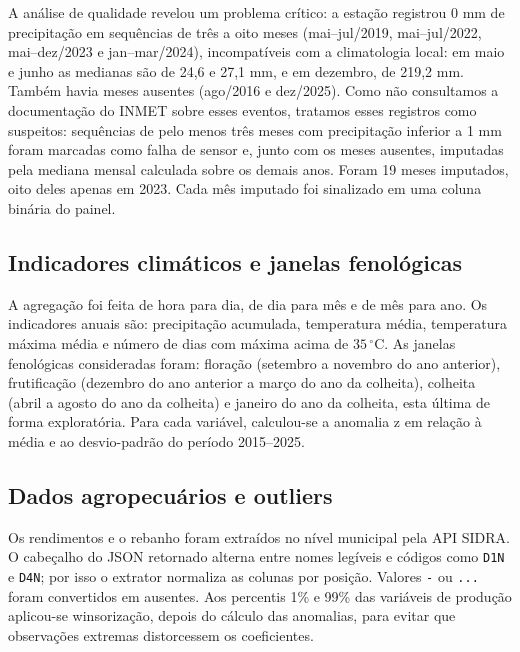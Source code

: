 \documentclass{RITA}
\begin{document}
A an\'alise de qualidade revelou um problema cr\'itico: a esta\c{c}\~ao registrou $0$ mm de precipita\c{c}\~ao em sequ\^encias de tr\^es a oito meses (mai--jul/2019, mai--jul/2022, mai--dez/2023 e jan--mar/2024), incompat\'iveis com a climatologia local: em maio e junho as medianas s\~ao de 24,6 e 27,1 mm, e em dezembro, de 219,2 mm. Tamb\'em havia meses ausentes (ago/2016 e dez/2025). Como n\~ao consultamos a documenta\c{c}\~ao do INMET sobre esses eventos, tratamos esses registros como suspeitos: sequ\^encias de pelo menos tr\^es meses com precipita\c{c}\~ao inferior a 1 mm foram marcadas como falha de sensor e, junto com os meses ausentes, imputadas pela mediana mensal calculada sobre os demais anos. Foram 19 meses imputados, oito deles apenas em 2023. Cada m\^es imputado foi sinalizado em uma coluna bin\'aria do painel.

\subsection{Indicadores clim\'aticos e janelas fenol\'ogicas}

A agrega\c{c}\~ao foi feita de hora para dia, de dia para m\^es e de m\^es para ano. Os indicadores anuais s\~ao: precipita\c{c}\~ao acumulada, temperatura m\'edia, temperatura m\'axima m\'edia e n\'umero de dias com m\'axima acima de $35\,^\circ$C. As janelas fenol\'ogicas consideradas foram: flora\c{c}\~ao (setembro a novembro do ano anterior), frutifica\c{c}\~ao (dezembro do ano anterior a mar\c{c}o do ano da colheita), colheita (abril a agosto do ano da colheita) e janeiro do ano da colheita, esta \'ultima de forma explorat\'oria. Para cada vari\'avel, calculou-se a anomalia z em rela\c{c}\~ao \`a m\'edia e ao desvio-padr\~ao do per\'iodo 2015--2025.

\subsection{Dados agropecu\'arios e outliers}

Os rendimentos e o rebanho foram extra\'idos no n\'ivel municipal pela API SIDRA. O cabe\c{c}alho do JSON retornado alterna entre nomes leg\'iveis e c\'odigos como \texttt{D1N} e \texttt{D4N}; por isso o extrator normaliza as colunas por posi\c{c}\~ao. Valores \texttt{-} ou \texttt{...} foram convertidos em ausentes. Aos percentis 1\% e 99\% das vari\'aveis de produ\c{c}\~ao aplicou-se winsoriza\c{c}\~ao, depois do c\'alculo das anomalias, para evitar que observa\c{c}\~oes extremas distorcessem os coeficientes.
\end{document}

